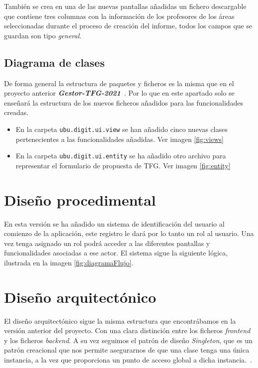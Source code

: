 También se crea en una de las nuevas pantallas añadidas un fichero descargable que contiene tres columnas con la información de los profesores de los áreas seleccionadas durante el proceso de creación del informe, todos los campos que se guardan son tipo \emph{general}.

\subsection{Diagrama de clases}

De forma general la estructura de paquetes y ficheros es la misma que en el proyecto anterior \textbf{\textit{Gestor-TFG-2021}}~\cite{Gestor-TFG-2021}. Por lo que en este apartado solo se enseñará la estructura de los nuevos ficheros añadidos para las funcionalidades creadas.

\begin{itemize}
	\item En la carpeta \texttt{ubu.digit.ui.view} se han añadido cinco nuevas clases pertenecientes a las funcionalidades añadidas. Ver imagen \ref{fig:views}
	
	
	\item En la carpeta \texttt{ubu.digit.ui.entity} se ha añadido otro archivo para representar el formulario de propuesta de TFG. Ver imagen \ref{fig:entity}
	
	
\end{itemize}

\section{Diseño procedimental}
En esta versión se ha añadido un sistema de identificación del usuario al comienzo de la aplicación, este registro le dará por lo tanto un rol al usuario. Una vez tenga asignado un rol podrá acceder a las diferentes pantallas y funcionalidades asociadas a ese actor.
El sistema sigue la siguiente lógica, ilustrada en la imagen \ref{fig:diagramaFlujo}.


\section{Diseño arquitectónico}

El diseño arquitectónico sigue la misma estructura que encontrábamos en la versión anterior del proyecto. Con una clara distinción entre los ficheros \emph{frontend} y los ficheros \emph{backend}.
A su vez seguimos el patrón de diseño \emph{Singleton}, que es un patrón creacional que nos permite asegurarnos de que una clase tenga una única instancia, a la vez que proporciona un punto de acceso global a dicha instancia.~\cite{Singleton}.
